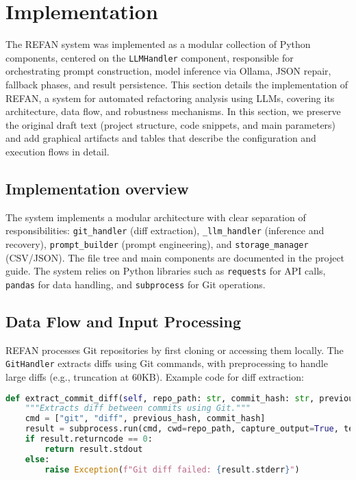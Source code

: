 \section{Implementation}
\label{sec:implementation}

The REFAN system was implemented as a modular collection of Python components,
centered on the \texttt{LLMHandler} component, responsible for orchestrating
prompt construction, model inference via Ollama, JSON repair,
fallback phases, and result persistence. This section details the implementation of REFAN, a system for automated refactoring analysis using LLMs, covering its architecture, data flow, and robustness mechanisms. In this section, we preserve the
original draft text (project structure, code snippets, and main parameters)
and add graphical artifacts and tables that describe the configuration and
execution flows in detail.

\subsection{Implementation overview}
The system implements a modular architecture with clear separation of responsibilities:
\texttt{git\_handler} (diff extraction), \texttt{\_llm\_handler} (inference and recovery),
\texttt{prompt\_builder} (prompt engineering), and \texttt{storage\_manager} (CSV/JSON).
The file tree and main components are documented in the project guide.%
The system relies on Python libraries such as \texttt{requests} for API calls, \texttt{pandas} for data handling, and \texttt{subprocess} for Git operations.

\subsection{Data Flow and Input Processing}
REFAN processes Git repositories by first cloning or accessing them locally. The \texttt{GitHandler} extracts diffs using Git commands, with preprocessing to handle large diffs (e.g., truncation at 60KB). Example code for diff extraction:

\begin{lstlisting}[language=Python]
def extract_commit_diff(self, repo_path: str, commit_hash: str, previous_hash: str) -> str:
    """Extracts diff between commits using Git."""
    cmd = ["git", "diff", previous_hash, commit_hash]
    result = subprocess.run(cmd, cwd=repo_path, capture_output=True, text=True)
    if result.returncode == 0:
        return result.stdout
    else:
        raise Exception(f"Git diff failed: {result.stderr}")
\end{lstlisting}

